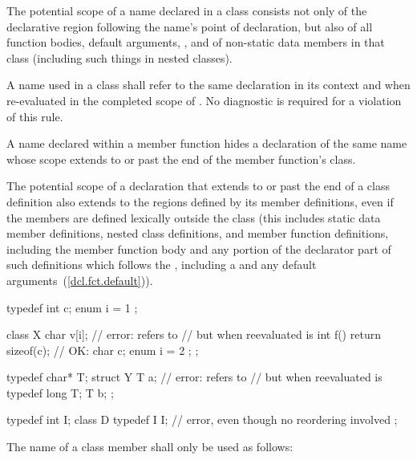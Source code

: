 \begin{enumeraten}
\item The potential scope of a name declared in a class consists not
only of the declarative region following the name's point of
declaration, but also of all function bodies, default arguments,
, and
 of non-static data members
in that class (including such
things in nested classes).
\item A name  used in a class  shall refer to the same
declaration in its context and when re-evaluated in the completed scope
of . No diagnostic is required for a violation of this rule.
\item A name declared within a member function hides a declaration of
the same name whose scope extends to or past the end of the member
function's class.
\item The potential scope of a declaration that extends to or past the
end of a class definition also extends to the regions defined by its
member definitions, even if the members are defined lexically outside
the class (this includes static data member definitions, nested class
definitions, and member function definitions, including the member function
body and any portion of the
declarator part of such definitions which follows the ,
including a  and any default
arguments~(\ref{dcl.fct.default})).\enterexample

\begin{codeblock}
typedef int  c;
enum { i = 1 };

class X {
  char  v[i];                       // error:  refers to 
                                    // but when reevaluated is 
  int  f() { return sizeof(c); }    //  OK: 
  char  c;
  enum { i = 2 };
};

typedef char*  T;
struct Y {
  T  a;                             // error:  refers to 
                                    // but when reevaluated is 
  typedef long  T;
  T  b;
};

typedef int I;
class D {
  typedef I I;                      // error, even though no reordering involved
};
\end{codeblock}
\exitexample
\end{enumeraten}

\pnum
The name of a class member shall only be used as follows:

